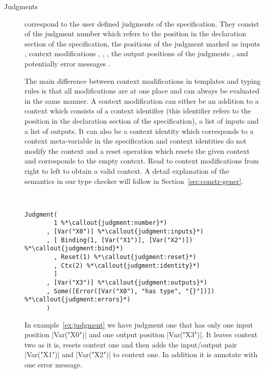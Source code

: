\begin{description}
\item[Judgments] correspond to the user defined judgments of the
  specification. They consist of the judgment number
   which refers to the position in the
  declaration section of the specification, the positions of the
  judgment marked as inputs , context
  modifications ,
  , , the
  output positions of the judgments , and
  potentially error messages .

  The main difference between context modifications in templates and
  typing rules is that all modifications are at one place and can
  always be evaluated in the same manner. A context modification can
  either be an addition to a context  which
  consists of a context identifier (this identifier refers to the
  position in the declaration section of the specification), a list of
  inputs and a list of outputs. It can also be a context identity
   which corresponds to a context
  meta-variable in the specification and context identities do not
  modify the context and a reset operation 
  which resets the given context and corresponds to the empty
  context. Read to context modifications from right to left to obtain
  a valid context. A detail explanation of the semantics in our type
  checker will follow in Section~\ref{sec:constr-gener}.

\begin{example}{~}
\begin{lstlisting}[language=sltc]
Judgment(
        1 %*\callout{judgment:number}*)
      , [Var("X0")] %*\callout{judgment:inputs}*)
      , [ Binding(1, [Var("X1")], [Var("X2")]) %*\callout{judgment:bind}*)
        , Reset(1) %*\callout{judgment:reset}*)
        , Ctx(2) %*\callout{judgment:identity}*)
        ]
      , [Var("X3")] %*\callout{judgment:outputs}*)
      , Some([Error([Var("X0"), "has type", "{}"])]) %*\callout{judgment:errors}*)
      )
\end{lstlisting}
\label{ex:judgment}
\end{example}

In example~\ref{ex:judgment} we have judgment one that has only one
input position \code|Var("X0")| and one output position
\code|Var("X3")|. It leaves context two as it is, resets context one
and then adds the input/output pair \code|Var("X1")| and
\code|Var("X2")| to context one. In addition it is annotate with one
error message.


\end{description}
